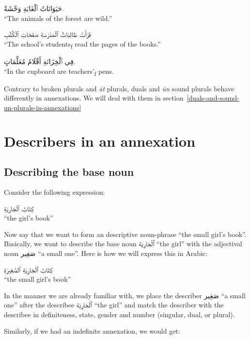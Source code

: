 \documentclass[
  10pt,
]{book}
\begin{document}
\foreignlanguage{arabic}{حَيَوَانَاتُ ٱلْغَابَةِ وَحْشَةٌ.}\\
\enquote{The animals of the forest are wild.}

\foreignlanguage{arabic}{قَرَأَتْ طَالِبَاتُ ٱلْمَدْرَسَةِ صَفَحَاتِ ٱلْکُتُبِ}\\
\enquote{The school's students\textsubscript{f} read the pages of the books.}

\foreignlanguage{arabic}{فِي ٱلْخِزَانَةِ أَقْلَامُ مُعَلِّمَاتٍ.}\\
``In the cupboard are teachers'\textsubscript{f} pens.

Contrary to broken plurals and \emph{āt} plurals, duals and \emph{ūn} sound plurals behave differently in annexations. We will deal with them in section~\ref{duals-and-sound-un-plurals-in-annexations}

\section{Describers in an annexation}\label{describers-in-an-annexation}

\subsection{Describing the base noun}\label{describing-the-base-noun}

Consider the following expression:

\foreignlanguage{arabic}{کِتَابُ ٱلْجَارِيَةِ}\\
\enquote{the girl's book}

Now say that we want to form an descriptive noun-phrase \enquote{the small girl's book}.
Basically, we want to describe the base noun \foreignlanguage{arabic}{ٱَلْجَارِيَة} \enquote{the girl} with the adjectival noun \foreignlanguage{arabic}{صَغِير} \enquote{a small one}.
Here is how we will express this in Arabic:

\foreignlanguage{arabic}{کِتَابُ ٱلْجَارِيَةِ ٱلصَّغِيرَةِ}\\
\enquote{the small girl's book}

In the manner we are already familiar with, we place the describer \foreignlanguage{arabic}{صَغِير} \enquote{a small one} after the describee
\foreignlanguage{arabic}{ٱَلْجَارِيَة} \enquote{the girl}
and match the describer with the describee in definiteness, state, gender and number (singular, dual, or plural).

Similarly, if we had an indefinite annexation, we would get:
\end{document}

